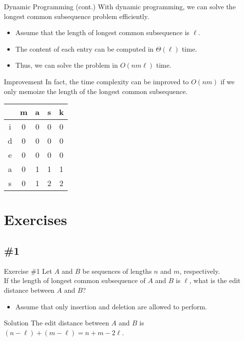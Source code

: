 \documentclass{beamer}
\begin{document}
\begin{frame}{Dynamic Programming (cont.)}
  With dynamic programming, we can solve the longest common subsequence problem
  efficiently. \pause
  \begin{itemize}
    \item Assume that the length of longest common subsequence is $\ell$.
    \pause
    \item The content of each entry can be computed in $\Theta(\ell)$ time.
    \pause
    \item Thus, we can solve the problem in $O(nm\ell)$ time.
  \end{itemize}
\end{frame}

\begin{frame}{Improvement}
  In fact, the time complexity can be improved to $O(nm)$ if we only memoize
  the length of the longest common subsequence.
  \begin{center}
    \ttfamily
    \begin{tabular}{c|cccc}
        & m & a & s & k \\ 
      \hline
      i & 0 & 0 & 0 & 0 \\
      d & 0 & 0 & 0 & 0 \\
      e & \color{red}0 & 0 & 0 & 0 \\
      a & 0 & \color{red}1 & 1 & 1 \\
      s & 0 & 1 & \color{red}2 & \color{red}2
    \end{tabular}
  \end{center}
\end{frame}

\section{Exercises}
\subsection{\#1}
\begin{frame}{Exercise \#1}
  Let $A$ and $B$ be sequences of lengths $n$ and $m$, respectively. \\[.5em]
  \pause
  If the length of longest common subsequence of $A$ and $B$ is $\ell$, what is
  the edit distance between $A$ and $B$?
  \begin{itemize}
    \item Assume that only insertion and deletion are allowed to perform.
    \pause
  \end{itemize}
  \begin{block}{Solution}
    The edit distance between $A$ and $B$ is
    $(n-\ell) + (m-\ell) = n + m - 2\ell$.
  \end{block}
\end{frame}
\end{document}
